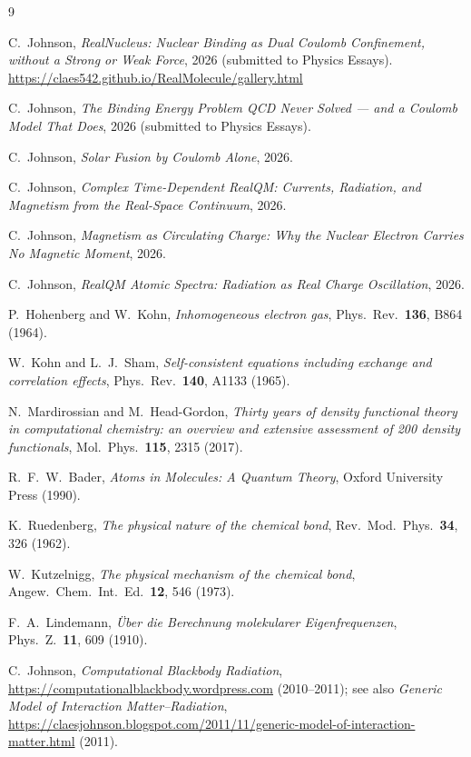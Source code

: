 \documentclass[11pt]{article}
\begin{document}
\begin{thebibliography}{9}

C.~Johnson,
\emph{RealNucleus: Nuclear Binding as Dual Coulomb Confinement, without a Strong or Weak Force},
2026 (submitted to Physics Essays).
\url{https://claes542.github.io/RealMolecule/gallery.html}

C.~Johnson,
\emph{The Binding Energy Problem QCD Never Solved --- and a Coulomb Model That Does},
2026 (submitted to Physics Essays).

C.~Johnson,
\emph{Solar Fusion by Coulomb Alone},
2026.

C.~Johnson,
\emph{Complex Time-Dependent RealQM: Currents, Radiation, and Magnetism from the Real-Space Continuum},
2026.

C.~Johnson,
\emph{Magnetism as Circulating Charge: Why the Nuclear Electron Carries No Magnetic Moment},
2026.

C.~Johnson,
\emph{RealQM Atomic Spectra: Radiation as Real Charge Oscillation},
2026.

P.~Hohenberg and W.~Kohn,
\emph{Inhomogeneous electron gas},
Phys.\ Rev.\ \textbf{136}, B864 (1964).

W.~Kohn and L.~J.~Sham,
\emph{Self-consistent equations including exchange and correlation effects},
Phys.\ Rev.\ \textbf{140}, A1133 (1965).

N.~Mardirossian and M.~Head-Gordon,
\emph{Thirty years of density functional theory in computational chemistry: an overview and extensive assessment of 200 density functionals},
Mol.\ Phys.\ \textbf{115}, 2315 (2017).

R.~F.~W.~Bader,
\emph{Atoms in Molecules: A Quantum Theory},
Oxford University Press (1990).

K.~Ruedenberg,
\emph{The physical nature of the chemical bond},
Rev.\ Mod.\ Phys.\ \textbf{34}, 326 (1962).

W.~Kutzelnigg,
\emph{The physical mechanism of the chemical bond},
Angew.\ Chem.\ Int.\ Ed.\ \textbf{12}, 546 (1973).

F.~A.~Lindemann,
\emph{\"Uber die Berechnung molekularer Eigenfrequenzen},
Phys.\ Z.\ \textbf{11}, 609 (1910).

C.~Johnson,
\emph{Computational Blackbody Radiation},
\url{https://computationalblackbody.wordpress.com} (2010--2011);
see also \emph{Generic Model of Interaction Matter--Radiation},
\url{https://claesjohnson.blogspot.com/2011/11/generic-model-of-interaction-matter.html} (2011).


\end{thebibliography}
\end{document}
